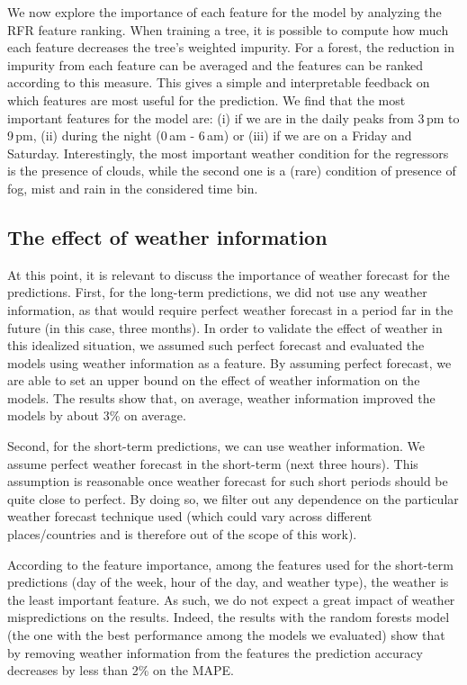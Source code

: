 We now explore the importance of each feature for the model by analyzing the RFR feature ranking.  
When training a tree, it is possible to compute how much each feature decreases the tree's weighted impurity. For a forest, the reduction in impurity from each feature can be averaged and the features can be ranked according to this measure. This gives a simple and interpretable feedback on which features are most useful for the prediction. 
We find that the most important features for the model are: (i) if we are in the daily peaks from 3\,pm to 9\,pm, (ii) during the night (0\,am - 6\,am) or (iii) if we are on a Friday and Saturday. Interestingly, the most important weather condition for the regressors is the presence of clouds, while the second one is a (rare) condition of presence of fog, mist and rain in the considered time bin. 

\subsection{The effect of weather information}

At this point, it is relevant to discuss the importance of weather forecast for the predictions.
First, for the long-term predictions, we did not use any weather information, as that would require perfect weather forecast in a period far in the future (in this case, three months). In order to validate the effect of weather in this idealized situation, we assumed such perfect forecast and evaluated the models using weather information as a feature. By assuming perfect forecast, we are able to set an upper bound on the effect of weather information on the models. The results show that, on average, weather information improved the models by about 3\% on average.

Second, for the short-term predictions, we can use weather information. We assume perfect weather forecast in the short-term (next three hours). This assumption is reasonable once weather forecast for such short periods should be quite close to perfect. By doing so, we filter out any dependence on the particular weather forecast technique used (which could vary across different places/countries and is therefore out of the scope of this work). 

According to the feature importance, among the features used for the short-term predictions (day of the week, hour of the day, and weather type), the weather is the least important feature. As such, we do not expect a great impact of weather mispredictions on the results. Indeed, the results with the random forests model (the one with the best performance among the models we evaluated) show that by removing weather information from the features the prediction accuracy decreases  by less than 2\% on the MAPE.
